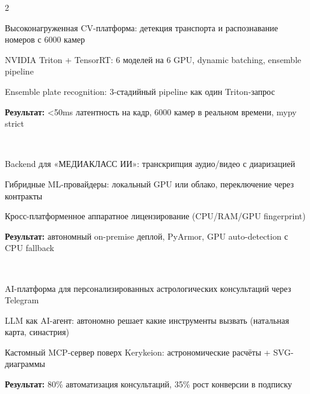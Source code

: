 \documentclass[]{deedy-resume-reversed}
\begin{document}
\begin{paracol}{2}
\\
\begin{tightemize}
\item Высоконагруженная CV-платформа: детекция транспорта и распознавание номеров с 6000 камер
\item NVIDIA Triton + TensorRT: 6 моделей на 6 GPU, dynamic batching, ensemble pipeline
\item Ensemble plate recognition: 3-стадийный pipeline как один Triton-запрос
\item \textbf{Результат:} <50ms латентность на кадр, 6000 камер в реальном времени, mypy strict
\end{tightemize}
\sectionsep

\\
\begin{tightemize}
\item Backend для «МЕДИАКЛАСС ИИ»: транскрипция аудио/видео с диаризацией
\item Гибридные ML-провайдеры: локальный GPU или облако, переключение через контракты
\item Кросс-платформенное аппаратное лицензирование (CPU/RAM/GPU fingerprint)
\item \textbf{Результат:} автономный on-premise деплой, PyArmor, GPU auto-detection с CPU fallback
\end{tightemize}
\sectionsep

\\
\begin{tightemize}
\item AI-платформа для персонализированных астрологических консультаций через Telegram
\item LLM как AI-агент: автономно решает какие инструменты вызвать (натальная карта, синастрия)
\item Кастомный MCP-сервер поверх Kerykeion: астрономические расчёты + SVG-диаграммы
\item \textbf{Результат:} 80\% автоматизация консультаций, 35\% рост конверсии в подписку
\end{tightemize}
\sectionsep


\end{paracol}
\end{document}
